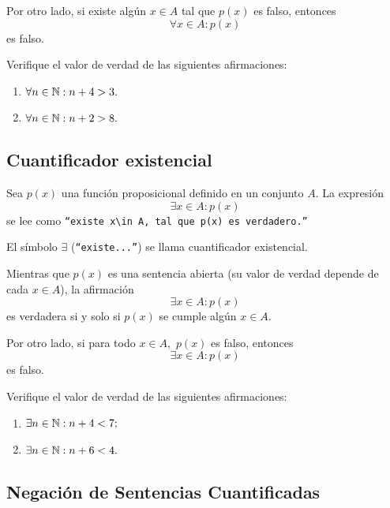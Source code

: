  Por otro lado, si existe alg\'un $x\in A$ tal que $p(x)$ es falso, entonces $$\forall x\in A: p(x)$$ es falso.



 \begin{problema}
  \label{lip:exmp:4.8}
  Verifique el valor de verdad de las siguientes afirmaciones:
  \begin{enumerate}
   \item $\forall n \in \mathbb{N}: n+4>3.$ 
   \item $\forall n \in \mathbb{N}: n+2>8.$
  \end{enumerate}

 \end{problema}



\subsection{Cuantificador existencial}


 Sea $p(x)$ una funci\'on proposicional definido en un conjunto $A.$ La expresi\'on
 \begin{equation}
 \label{lip:4.3}
   \exists x \in A: p(x)
 \end{equation} 
 se lee como  \texttt{``existe $x\in A,$ tal que $p(x)$ es verdadero.''}  
 
 El s\'imbolo $\exists$ (\texttt{``existe...''}) se llama cuantificador existencial.




 Mientras que $p(x)$ es una sentencia abierta (su valor de verdad depende de cada $x\in A$), la afirmaci\'on 
 $$\exists x\in A: p(x)$$ es verdadera si y solo si $p(x)$ se cumple alg\'un $x\in A.$  



 Por otro lado, si para todo $x\in A,$ $p(x)$ es falso, entonces $$\exists x\in A: p(x)$$ es falso.



 Verifique el valor de verdad de las siguientes afirmaciones:
 \begin{enumerate}
  \item $\exists n  \in \mathbb{N}: n+4<7;$ 
  \item $\exists n \in \mathbb{N}: n+6<4.$
 \end{enumerate}



\subsection{Negaci\'on de Sentencias Cuantificadas}



